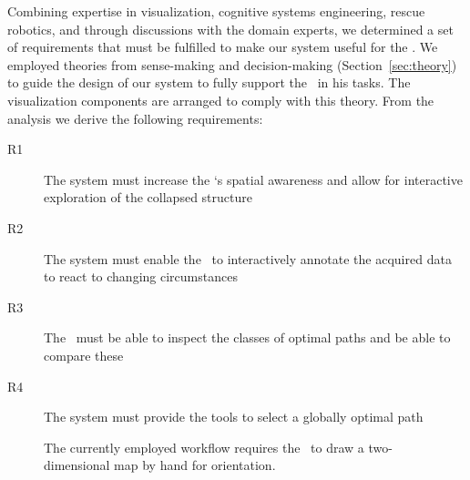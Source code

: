Combining expertise in visualization, cognitive systems engineering, rescue robotics, and through discussions with the domain experts, we determined a set of requirements that must be fulfilled to make our system useful for the \IC . We employed theories from sense-making and decision-making (Section~\ref{sec:theory}) to guide the design of our system to fully support the \IC\ in his tasks. The visualization components are arranged to comply with this theory. From the analysis we derive the following requirements:
\begin{description}
\item[R1] The system must increase the \IC `s spatial awareness and allow for interactive exploration of the collapsed structure
\item[R2] The system must enable the \IC\ to interactively annotate the acquired data to react to changing circumstances
\item[R3] The \IC\ must be able to inspect the classes of optimal paths and be able to compare these
\item[R4] The system must provide the tools to select a globally optimal path
\end{description}

\begin{figure}
	\centering
	\caption{The currently employed workflow requires the \IC\ to draw a two-dimensional map by hand for orientation.}
	\label{fig:workflow:sota}
\end{figure}
